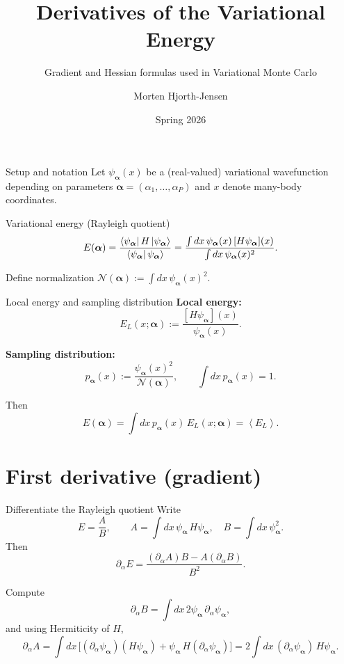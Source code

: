 \documentclass[aspectratio=169]{beamer}
\title{Derivatives of the Variational Energy}
\subtitle{Gradient and Hessian formulas used in Variational Monte Carlo}
\author{Morten Hjorth-Jensen}
\date{Spring 2026}
\newcommand{\avg}[1]{\left\langle #1 \right\rangle}
\newcommand{\psia}{\psi_{\bm{\alpha}}}
\newcommand{\El}{E_L}
\begin{document}
\begin{frame}
\titlepage
\end{frame}

\begin{frame}{Setup and notation}
Let $\psia(x)$ be a (real-valued) variational wavefunction depending on parameters
$\bm{\alpha}=(\alpha_1,\dots,\alpha_P)$ and $x$ denote many-body coordinates.

\begin{block}{Variational energy (Rayleigh quotient)}
\[
E(\bm{\alpha})=\frac{\bra{\psia}H\ket{\psia}}{\bra{\psia}\psia\rangle}
=
\frac{\int dx\, \psia(x)\, [H\psia](x)}{\int dx\, \psia(x)^2}.
\]
\end{block}

Define normalization $\mathcal{N}(\bm{\alpha}) := \int dx\, \psia(x)^2$.
\end{frame}

\begin{frame}{Local energy and sampling distribution}
\textbf{Local energy:}
\[
\El(x;\bm{\alpha}) := \frac{[H\psia](x)}{\psia(x)}.
\]

\textbf{Sampling distribution:}
\[
p_{\bm{\alpha}}(x) := \frac{\psia(x)^2}{\mathcal{N}(\bm{\alpha})},
\qquad
\int dx\, p_{\bm{\alpha}}(x)=1.
\]

Then
\[
E(\bm{\alpha})=\int dx\, p_{\bm{\alpha}}(x)\, \El(x;\bm{\alpha})
=\avg{\El}.
\]
\end{frame}

\section{First derivative (gradient)}

\begin{frame}{Differentiate the Rayleigh quotient}
Write
\[
E=\frac{A}{B},
\qquad
A=\int dx\, \psia\,H\psia,\quad B=\int dx\,\psia^2.
\]
Then
\[
\partial_\alpha E = \frac{(\partial_\alpha A)B - A(\partial_\alpha B)}{B^2}.
\]

Compute
\[
\partial_\alpha B = \int dx\, 2\psia\,\partial_\alpha \psia,
\]
and using Hermiticity of $H$,
\[
\partial_\alpha A
=
\int dx\, \Big[(\partial_\alpha \psia)(H\psia)+\psia\,H(\partial_\alpha\psia)\Big]
=
2\int dx\, (\partial_\alpha\psia)\,H\psia.
\]
\end{frame}
\end{document}
